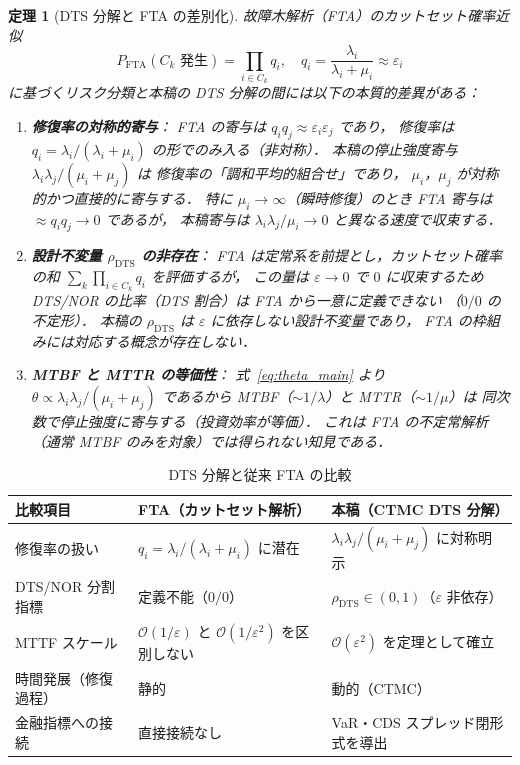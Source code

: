 \documentclass[12pt,a4paper]{article}
\theoremstyle{plain}
\newtheorem{theorem}{定理}[section]
\theoremstyle{definition}
\theoremstyle{remark}
\newcommand{\calO}{\mathcal{O}}
\newcommand{\eps}{\varepsilon}
\newcommand{\rhoDTS}{\rho_{\mathrm{DTS}}}
\begin{document}
\begin{theorem}[DTS 分解と FTA の差別化]\label{thm:DTS_vs_FTA}
  故障木解析（FTA）のカットセット確率近似
  \begin{equation}\label{eq:FTA}
    P_{\mathrm{FTA}}(C_k\text{ 発生}) = \prod_{i\in C_k}q_i,
    \quad q_i = \frac{\lambda_i}{\lambda_i+\mu_i} \approx \eps_i
  \end{equation}
  に基づくリスク分類と本稿の DTS 分解の間には以下の本質的差異がある：
  \begin{enumerate}[label=(\roman*)]
    \item \textbf{修復率の対称的寄与}：
      FTA の寄与は $q_iq_j\approx\eps_i\eps_j$ であり，
      修復率は $q_i=\lambda_i/(\lambda_i+\mu_i)$ の形でのみ入る（非対称）．
      本稿の停止強度寄与 $\lambda_i\lambda_j/(\mu_i+\mu_j)$ は
      修復率の「調和平均的組合せ」であり，
      $\mu_i$，$\mu_j$ が対称的かつ直接的に寄与する．
      特に $\mu_i\to\infty$（瞬時修復）のとき
      FTA 寄与は $\approx q_iq_j\to0$ であるが，
      本稿寄与は $\lambda_i\lambda_j/\mu_i\to0$ と異なる速度で収束する．

    \item \textbf{設計不変量 $\rhoDTS$ の非存在}：
      FTA は定常系を前提とし，カットセット確率の和
      $\sum_k\prod_{i\in C_k}q_i$ を評価するが，
      この量は $\eps\to0$ で $0$ に収束するため
      DTS/NOR の比率（DTS 割合）は FTA から一意に定義できない
      （$0/0$ の不定形）．
      本稿の $\rhoDTS$ は $\eps$ に依存しない設計不変量であり，
      FTA の枠組みには対応する概念が存在しない．

    \item \textbf{MTBF と MTTR の等価性}：
      式~\eqref{eq:theta_main} より
      $\theta \propto \lambda_i\lambda_j/(\mu_i+\mu_j)$
      であるから MTBF（$\sim 1/\lambda$）と MTTR（$\sim 1/\mu$）は
      同次数で停止強度に寄与する（投資効率が等価）．
      これは FTA の不定常解析（通常 MTBF のみを対象）では得られない知見である．
  \end{enumerate}
\end{theorem}

\begin{table}[H]
  \centering
  \caption{DTS 分解と従来 FTA の比較}
  \label{tab:FTA_compare}
  \footnotesize
  \begin{tabular}{p{3.8cm}p{4.2cm}p{4.2cm}}
    \toprule
    比較項目 & FTA（カットセット解析） & 本稿（CTMC DTS 分解） \\
    \midrule
    修復率の扱い & $q_i = \lambda_i/(\lambda_i+\mu_i)$ に潜在 & $\lambda_i\lambda_j/(\mu_i+\mu_j)$ に対称明示 \\
    DTS/NOR 分割指標 & 定義不能（$0/0$）& $\rhoDTS\in(0,1)$（$\eps$ 非依存） \\
    MTTF スケール & $\calO(1/\eps)$ と $\calO(1/\eps^2)$ を区別しない & $\calO(\eps^2)$ を定理として確立 \\
    時間発展（修復過程） & 静的 & 動的（CTMC）\\
    金融指標への接続 & 直接接続なし & VaR・CDS スプレッド閉形式を導出 \\
    \bottomrule
  \end{tabular}
\end{table}
\end{document}
